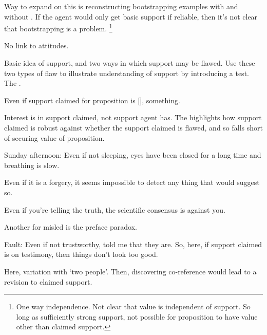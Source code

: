 \begin{note}[Mistaken]
\begin{proposition}[\eiS{-} --- \eiS{}]
{      Way to expand on this is reconstructing bootstrapping examples with and without \eiS{}.
      If the agent would only get basic support if reliable, then it's not clear that bootstrapping is a problem.
    }\nolinebreak
    \footnote{
      One way independence.
      Not clear that value is independent of support.
      So long as sufficiently strong support, not possible for proposition to have value other than claimed support.
    }
  \end{proposition}

  No link to attitudes.
\end{note}

\begin{note}
  Basic idea of support, and two ways in which support may be flawed.
  Use these two types of flaw to illustrate understanding of support by introducing a test.
  The \eit{}.

  Even if support claimed for proposition is [], something.

  Interest is in support claimed, not support agent has.
  The \eit{} highlights how support claimed is robust against whether the support claimed is flawed, and so falls short of securing value of proposition.
\end{note}


\begin{note}

  Sunday afternoon: Even if not sleeping, eyes have been closed for a long time and breathing is slow.

  Even if it is a forgery, it seems impossible to detect any thing that would suggest so.

  Even if you're telling the truth, the scientific consensus is against you.

  Another for misled is the preface paradox.


  Fault:
  Even if not trustworthy, told me that they are.
  So, here, if support claimed is on testimony, then things don't look too good.

  Here, variation with `two people'.
  Then, discovering co-reference would lead to a revision to claimed support.
\end{note}

